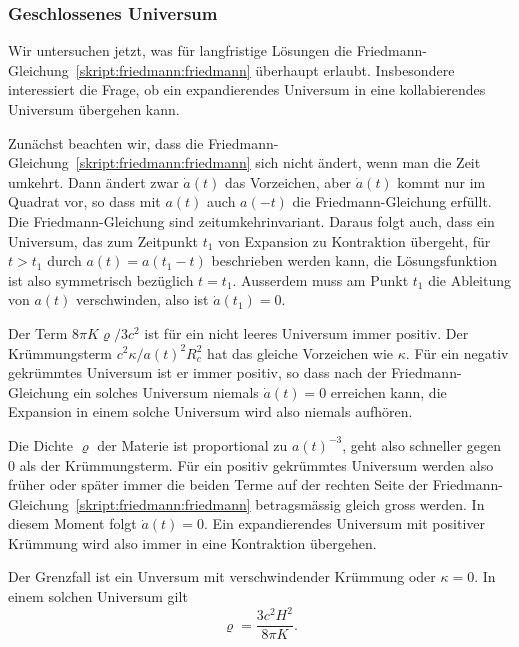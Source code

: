 \subsubsection{Geschlossenes Universum}
Wir untersuchen jetzt, was für langfristige Lösungen die
Friedmann-Gleichung~\eqref{skript:friedmann:friedmann}
überhaupt erlaubt.
Insbesondere interessiert die Frage, ob ein expandierendes Universum
in eine kollabierendes Universum übergehen kann.

Zunächst beachten wir, dass die 
Friedmann-Gleichung~\eqref{skript:friedmann:friedmann}
sich nicht ändert, wenn man die Zeit umkehrt.
Dann ändert zwar $\dot a(t)$ das Vorzeichen, aber $\dot a(t)$ kommt
nur im Quadrat vor, so dass mit $a(t)$ auch $a(-t)$ die Friedmann-Gleichung
erfüllt.
Die Friedmann-Gleichung sind zeitumkehrinvariant.
Daraus folgt auch, dass ein Universum, das zum Zeitpunkt $t_1$
von Expansion zu Kontraktion übergeht, für $t>t_1$ durch
$a(t)=a(t_1-t)$ beschrieben werden kann, die Lösungsfunktion ist
also symmetrisch bezüglich $t=t_1$.
Ausserdem muss
am Punkt $t_1$ die Ableitung von $a(t)$ verschwinden, also ist
$\dot a(t_1)=0$.

Der Term $8\pi K\varrho/3c^2$ ist für ein nicht leeres Universum
immer positiv.
Der Krümmungsterm $c^2\kappa/a(t)^2R_c^2$ hat das gleiche Vorzeichen
wie $\kappa$.
Für ein negativ gekrümmtes Universum ist er immer positiv, so dass
nach der Friedmann-Gleichung ein solches Universum niemals $\dot a(t)=0$
erreichen kann, die Expansion in einem solche Universum wird also
niemals aufhören.

Die Dichte $\varrho$ der Materie ist proportional zu $a(t)^{-3}$, geht
also schneller gegen $0$ als der Krümmungsterm.
Für ein positiv gekrümmtes Universum werden also früher oder später immer
die beiden Terme auf der rechten Seite der
Friedmann-Gleichung~\eqref{skript:friedmann:friedmann}
betragsmässig gleich gross werden.
In diesem Moment folgt $\dot a(t) = 0$.
Ein expandierendes Universum mit positiver Krümmung wird also immer in eine 
Kontraktion übergehen.

Der Grenzfall ist ein Unversum mit verschwindender Krümmung oder $\kappa=0$.
In einem solchen Universum gilt
\begin{equation}
\varrho = \frac{3c^2H^2}{8\pi K}.
\label{skript:friedmann::dichte}
\end{equation}

